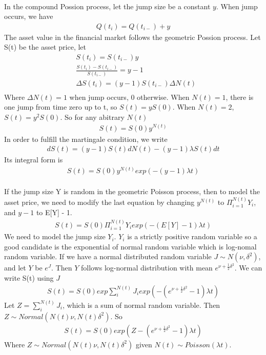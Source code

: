 \documentclass[a4paper]{article}
\begin{document}
\\
In the compound Possion process, let the jump size be a constant $y$. When jump occurs, we have 
\begin{align*}
	Q(t_i) = Q(t_{i-}) + y 
\end{align*}
The asset value in the financial market follows the geometric Possion process. Let S(t) be the asset price, let
\begin{align*}
	& S(t_i) = S(t_{i-}) y \\
	& \frac{S(t_i) - S(t_{i-})}{S(t_{i-})} =  y - 1 \\
	&  \Delta S(t_i) =  (y - 1) S(t_{i-}) \Delta N(t)  \\
\end{align*}
Where $\Delta N(t) = 1$ when jump occurs, $0$ otherwise. When $N(t) = 1$, there is one jump from time zero up to t, so $S(t) = yS(0)$. When $N(t) = 2$, $S(t) = y^2 S(0)$. So for any abitrary $N(t)$
\begin{align*}
	S(t) = S(0)y^{N(t)} 
\end{align*}
In order to fulfill the martingale condition, we write
\begin{align*}
	dS(t) = (y - 1)S(t) dN(t) - (y - 1) \lambda S(t) dt
\end{align*}
Its integral form is
\begin{align*}
	S(t) = S(0)y^{N(t)} exp(- (y - 1) \lambda t) 
\end{align*}
\\
If the jump size Y is random in the geometric Poisson process, then to model the asset price, we need to modify
the last equation by changing $y^{N(t)}$ to $\Pi_{i=1}^{N(t)} Y_i$, and $y - 1$ to E[Y] - 1. 
\begin{align*}
	S(t) = S(0)\Pi_{i=1}^{N(t)} Y_i exp(- (E[Y] - 1) \lambda t) 
\end{align*}
We need to model the jump size $Y_i$. $Y_i$ is a strictly positive random variable so a good candidate is the exponential of normal random variable which is log-nomal random variable. If we have a normal distributed random variable $J \sim N(\nu, \delta^2)$, and let $Y$ be $e^{J}$. Then $Y$ follows log-normal distribution with mean $e^{\nu + \frac{1}{2}\delta^2}$. We can write S(t) using $J$
\begin{align*}
	S(t) = S(0) exp{\sum_i^{N(t)} J_i} exp(-(e^{\nu + \frac{1}{2}\delta^2}-1) \lambda t) 
\end{align*}
Let $Z = \sum_i^{N(t)} J_i$, which is a sum of normal random variable. Then $Z \sim Normal(N(t)\nu, N(t)\delta^2)$. So
\begin{align*}
	S(t) = S(0) exp{(Z -(e^{\nu + \frac{1}{2}\delta^2}-1) \lambda t)} 
\end{align*}
Where $ Z \sim Normal(N(t)\nu, N(t)\delta^2)$ given $N(t) \sim Poisson(\lambda t)$.\\
\end{document}

